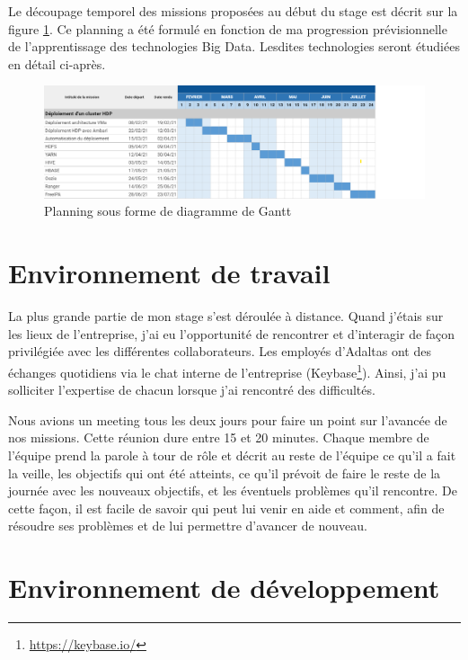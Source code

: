 \documentclass[12pt, french]{report}
\begin{document}
Le découpage temporel des missions proposées au début du stage est décrit sur la figure \ref{fig:planning}. Ce planning a été formulé en fonction de ma progression prévisionnelle de l'apprentissage des technologies Big Data. Lesdites technologies seront étudiées en détail ci-après.

\begin{figure}[h]
\includegraphics[scale=0.5]{assets/img/gantt.png}
\centering
\caption{Planning sous forme de diagramme de Gantt}
\label{fig:planning}
\end{figure}

\section{Environnement de travail}

La plus grande partie de mon stage s'est déroulée à distance. Quand j'étais sur les lieux de l'entreprise, j'ai eu l'opportunité de rencontrer et d'interagir de façon privilégiée avec les différentes collaborateurs. Les employés d’Adaltas ont des échanges quotidiens via le chat interne de l’entreprise (Keybase\footnote{\href{https://keybase.io/}{https://keybase.io/}}). Ainsi, j'ai pu solliciter l'expertise de chacun lorsque j'ai rencontré des difficultés.

Nous avions un meeting tous les deux jours pour faire un point sur l'avancée de nos missions. Cette réunion dure entre 15 et 20 minutes. Chaque membre de l'équipe prend la parole à tour de rôle et décrit au reste de l’équipe ce qu’il a fait la veille, les objectifs qui ont été atteints, ce qu’il prévoit de faire le reste de la journée avec les nouveaux objectifs, et les éventuels problèmes qu’il rencontre. De cette façon, il est facile de savoir qui peut lui venir en aide et comment, afin de résoudre ses problèmes et de lui permettre d’avancer de nouveau.

\section{Environnement de développement}
\end{document}
